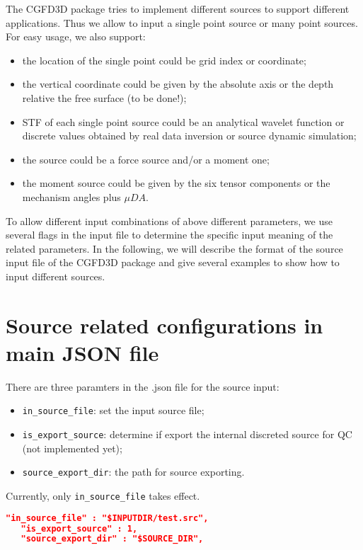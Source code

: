 The CGFD3D package tries to implement different sources to support different applications.
Thus we allow to input a single point source or many point sources.
For easy usage, we also support:
\begin{itemize}
    \item the location of the single point could be grid index or coordinate;
    \item the vertical coordinate could be given by the absolute axis or the depth relative the free surface (to be done!);
    \item STF of each single point source could be an analytical wavelet function or discrete values obtained by real data inversion or source dynamic simulation;
    \item the source could be a force source and/or a moment one;
    \item the  moment source could be given by the six tensor components or the mechanism angles plus $\mu DA$.
\end{itemize}


To allow different input combinations of above different parameters, 
we use several flags in the input file to determine the specific input meaning of the related parameters.
In the following, we will describe the format of the source input file of the CGFD3D package
 and give several examples to show how to input different sources.


\section{Source related configurations in main JSON file} \label{src_json}

There are three paramters in the .json file for the source input:
\begin{itemize}
  \item \verb|in_source_file|: set the input source file;
  \item \verb|is_export_source|: determine if export the internal discreted source for QC (not implemented yet);
  \item \verb|source_export_dir|: the path for source exporting.
\end{itemize}
Currently, only \verb|in_source_file| takes effect.

\begin{lstlisting}[language=json, title=An example of source settings in .json, frame=tb]
   "in_source_file" : "$INPUTDIR/test.src",
   "is_export_source" : 1,
   "source_export_dir" : "$SOURCE_DIR",
\end{lstlisting}


